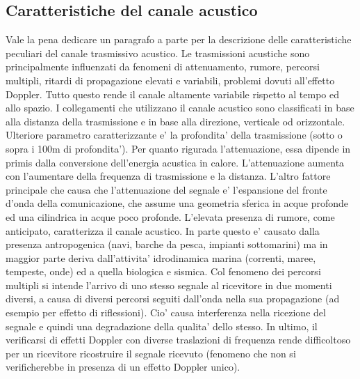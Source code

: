 \subsection{Caratteristiche del canale acustico}
Vale la pena dedicare un paragrafo a parte per la descrizione delle caratteristiche peculiari del canale trasmissivo acustico. Le trasmissioni acustiche sono principalmente influenzati da fenomeni di attenuamento, rumore, percorsi multipli, ritardi di propagazione elevati e variabili, problemi dovuti all'effetto Doppler.\newline
Tutto questo rende il canale altamente variabile rispetto al tempo ed allo spazio. I collegamenti che utilizzano il canale acustico sono classificati  in base alla distanza della trasmissione e in base alla direzione, verticale od orizzontale. Ulteriore parametro caratterizzante e' la profondita' della trasmissione (sotto o sopra i 100m di profondita').\newline
Per quanto rigurada l'attenuazione, essa dipende in primis dalla conversione dell'energia acustica in calore. L'attenuazione aumenta con l'aumentare della frequenza di trasmissione e la distanza. 
L'altro fattore principale che causa che l'attenuazione del segnale e' l'espansione del fronte d'onda della comunicazione, che assume una geometria sferica in acque profonde ed una cilindrica in acque poco profonde.\newline
L'elevata presenza di rumore, come anticipato, caratterizza il canale acustico. In parte questo e' causato dalla presenza antropogenica (navi, barche da pesca, impianti sottomarini) ma in maggior parte deriva dall'attivita' idrodinamica marina (correnti, maree, tempeste, onde) ed a quella biologica e sismica.\newline
Col fenomeno dei percorsi multipli si intende l'arrivo di uno stesso segnale al ricevitore in due momenti diversi, a causa di diversi percorsi seguiti dall'onda nella sua propagazione (ad esempio per effetto  di riflessioni). Cio' causa interferenza nella ricezione del segnale e quindi una degradazione della qualita' dello stesso.\newline
In ultimo, il verificarsi di effetti Doppler con diverse traslazioni di frequenza rende difficoltoso per un ricevitore ricostruire il segnale ricevuto (fenomeno che non si verificherebbe in presenza di un effetto Doppler unico).

